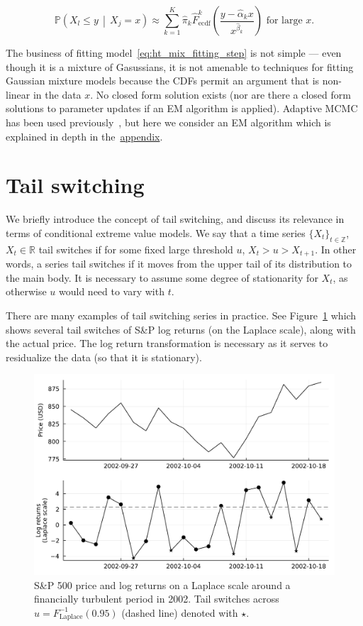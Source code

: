 \documentclass[11pt,twoside,openany]{book}
\newcommand{\prob}{\mathbb{P}}
\newcommand{\reals}{\mathbb{R}}
\numberwithin{Theorem}{chapter}
\numberwithin{Definition}{chapter}
\numberwithin{Lemma}{chapter}
\numberwithin{Algorithm}{chapter}
\numberwithin{equation}{chapter}
\begin{document}
\begin{equation}\label{eq:ht_mix_final}
\prob\left(X_{l}\leq y\,\middle|\, X_j = x\right) \approx
\sum_{k=1}^K\hat\pi_k \hat F^k_{\text{ecdf}}\left(\frac{y - \hat\alpha_k
x}{x^{\hat\beta_k}}\right) \text{ for large }x.
\end{equation}

The business of fitting model~\eqref{eq:ht_mix_fitting_step} is not simple ---
even though it is a mixture of Gasussians, it is not amenable to techniques for
fitting Gaussian mixture models because the CDFs permit an argument that
is non-linear in the data $x$.
No closed form solution exists (nor are there a closed form solutions to
parameter updates if an EM algorithm is applied). Adaptive MCMC has been used
previously~\citep{tendijck2021modeling}, but here we consider an EM algorithm
which is explained in depth in
the~\hyperref[appendix:htnormalem]{appendix}.

\section{Tail switching}

We briefly introduce the concept of tail switching, and discuss its relevance in
terms of conditional extreme value models.
We say that a time series $\{X_t\}_{t\in \mathbb{Z}}$, $X_t\in\reals$ tail
switches if
for some fixed large threshold $u$,
$X_{t} > u > X_{t+1}$. In other words, a series tail switches if it moves from
the upper tail of its distribution to the main body. It is necessary to assume
some degree of stationarity for
$X_t$, as otherwise $u$ would need to vary with $t$.

There are many examples of tail switching series in practice.
See Figure~\ref{fig:sap500ts} which shows several tail switches of S\&P log returns
(on the Laplace scale), along with the actual price.
The log return transformation is necessary as it serves to residualize the
data (so that it is stationary).

\begin{figure}[htp]
  \centering
  \includegraphics[scale=0.70]{../tail-switching/figures/spy_tail_switch.pdf}
  \caption{S\&P 500 price and log returns on a Laplace scale around a financially turbulent period in 2002.
  Tail switches across $u=F_{\text{Laplace}}^{-1}(0.95)$ (dashed line) denoted with $\star$.}\label{fig:sap500ts}
\end{figure}
\end{document}
